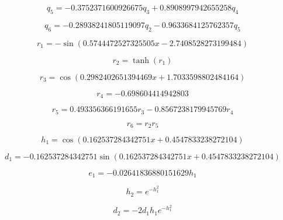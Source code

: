 \begin{equation}
q_{5}=- 0.3752371600926675 q_{3} + 0.8908997942655258 q_{4}
\end{equation}


\begin{equation}
q_{6}=- 0.28938241805119097 q_{2} - 0.9633684125762357 q_{5}
\end{equation}


\begin{equation}
r_{1}=- \sin{\left(0.5744472527325505 x - 2.7408528273199484 \right)}
\end{equation}


\begin{equation}
r_{2}=\tanh{\left(r_{1} \right)}
\end{equation}


\begin{equation}
r_{3}=\cos{\left(0.2982402651394469 x + 1.7033598802484164 \right)}
\end{equation}


\begin{equation}
r_{4}=-0.698604414942803
\end{equation}


\begin{equation}
r_{5}=0.493356366191655 r_{3} - 0.8567238179945769 r_{4}
\end{equation}


\begin{equation}
r_{6}=r_{2} r_{5}
\end{equation}


\begin{equation}
h_{1}=\cos{\left(0.162537284342751 x + 0.4547833238272104 \right)}
\end{equation}


\begin{equation}
d_{1}=- 0.162537284342751 \sin{\left(0.162537284342751 x + 0.4547833238272104 \right)}
\end{equation}


\begin{equation}
e_{1}=- 0.02641836880151629 h_{1}
\end{equation}


\begin{equation}
h_{2}=e^{- h_{1}^{2}}
\end{equation}


\begin{equation}
d_{2}=- 2 d_{1} h_{1} e^{- h_{1}^{2}}
\end{equation}


